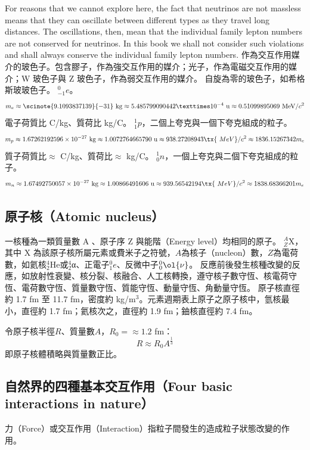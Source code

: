 \documentclass[a4paper,12pt]{article}
\begin{document}
For reasons that we cannot explore here, the fact that neutrinos are not massless means that they can oscillate between different types as they travel long distances. The oscillations, then, mean that the individual family lepton numbers are not conserved for neutrinos. In this book we shall not consider such violations and shall always conserve the individual family lepton numbers.
作為交互作用媒介的玻色子。包含膠子，作為強交互作用的媒介；光子，作為電磁交互作用的媒介；W 玻色子與 Z 玻色子，作為弱交互作用的媒介。
自旋為零的玻色子，如希格斯玻玻色子。
$^0_{-1}e$。
\[m_e\approx\scinote{9.1093837139}{-31}\text{\ kg}\approx5.485799090442×10^{-4}\text{\ u}\approx0.51099895069\text{\ MeV/}c^2\]
電子荷質比 C/kg、質荷比 kg/C。
$^1_1p$，二個上夸克與一個下夸克組成的粒子。
\[m_p\approx 1.67262192596\times 10^{-27}\text{\ kg}\approx 1.0072764665790\text{\ u}\approx938.27208943\tx{\ MeV}/c^2\approx 1836.15267342m_e\]
質子荷質比$\approx$ C/kg、質荷比$\approx$ kg/C。
$^1_0n$，一個上夸克與二個下夸克組成的粒子。
\[m_n\approx1.67492750057\times 10^{-27}\text{\ kg}\approx1.00866491606\text{\ u}\approx939.56542194\tx{\ MeV}/c^2\approx1838.68366201m_e\]

\subsection{原子核（Atomic nucleus）}
一核種為一類質量數 A 、原子序 Z 與能階（Energy level）均相同的原子。
$^{A}_{Z}\text{X}$，其中 X 為該原子核所屬元素或費米子之符號，$A$為核子（nucleon）數，$Z$為電荷數，如氦核$^4_2$He或$^4_2$α、正電子$^0_1e$、反微中子$^0_0\ol{\nu}$。
反應前後發生核種改變的反應，如放射性衰變、核分裂、核融合、人工核轉換，遵守核子數守恆、核電荷守恆、電荷數守恆、質量數守恆、質能守恆、動量守恆、角動量守恆。
原子核直徑約 1.7 fm 至 11.7 fm，密度約  kg/m$^3$。元素週期表上原子之原子核中，氫核最小，直徑約 1.7 fm；氦核次之，直徑約 1.9 fm；鈾核直徑約 7.4 fm。

令原子核半徑$R$、質量數$A$，$R_0=
\approx 1.2$ fm：
\[R\approx R_0A^{\frac{1}{3}}\]
即原子核體積略與質量數正比。



\subsection{自然界的四種基本交互作用（Four basic interactions in nature）}
力（Force）或交互作用（Interaction）指粒子間發生的造成粒子狀態改變的作用。
\end{document}
